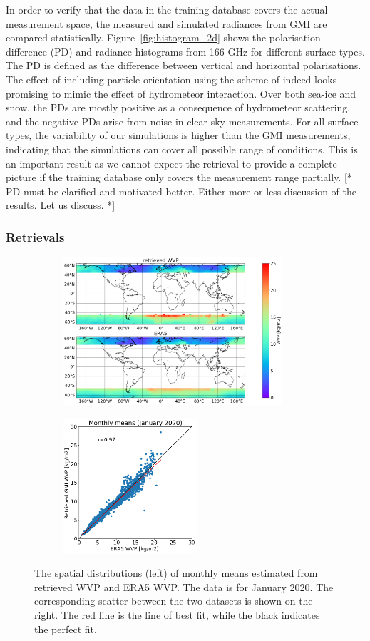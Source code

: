 \documentclass[12pt,oneside,a4paper]{article}
\newcommand\intodo[1]{{\color{red} [* #1 *]}}
\begin{document}
In order to verify that the data in the training database covers the actual
measurement space, the measured and simulated radiances from GMI are compared
statistically. Figure~\ref{fig:histogram_2d} shows the polarisation difference
(PD) and radiance histograms from 166 GHz for different surface types. The PD
is defined as the difference between vertical and horizontal polarisations. The
effect of including particle orientation using the scheme of
\citet{baralakas:intro:21} indeed looks promising to mimic the effect of
hydrometeor interaction. Over both sea-ice and snow, the PDs are mostly
positive as a consequence of hydrometeor scattering, and the negative PDs arise
from noise in clear-sky measurements. For all surface types, the variability of
our simulations is higher than the GMI measurements, indicating that the
simulations can cover all possible range of conditions. This is an important
result as we cannot expect the retrieval to provide a complete picture if the
training database only covers the measurement range partially.
\intodo{PD must be clarified and motivated better. Either more or less
  discussion of the results. Let us discuss.}


\subsubsection{Retrievals}
\label{sec:preliminary_results}
\begin{figure}[t]
	\centering
	\begin{subfigure}{.54\textwidth}
		\includegraphics[height = 55mm]{Figures/WVP_spatial_jan2020.png}
	\end{subfigure}
	\begin{subfigure}{.34\textwidth}
	\includegraphics[height = 50mm]{Figures/WVP_scatter_monthlymean.png} 
	\end{subfigure}
	\caption{The spatial distributions (left) of monthly means estimated from retrieved WVP and ERA5 WVP. The data is for January 2020. The corresponding scatter between the two datasets is shown on the right. The red line is the line of best fit, while the black indicates the perfect fit.}
	\label{fig:WVP_retrievals}
\end{figure}
\end{document}
